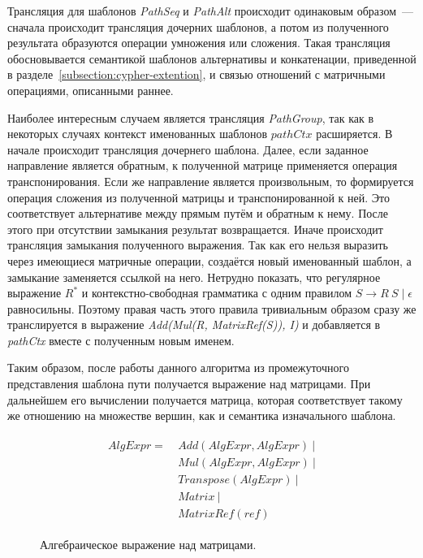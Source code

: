 Трансляция для шаблонов \textit{PathSeq} и \textit{PathAlt} происходит одинаковым образом~--- сначала происходит трансляция дочерних шаблонов, а потом из полученного результата образуются операции умножения или сложения. Такая трансляция обосновывается семантикой шаблонов альтернативы и конкатенации, приведенной в разделе~\ref{subsection:cypher-extention}, и связью отношений с матричными операциями, описанными раннее.

Наиболее интересным случаем является трансляция \textit{Path\-Group}, так как в некоторых случаях контекст именованных шаблонов $pathCtx$ расширяется. В начале происходит трансляция дочернего шаблона. Далее, если заданное направление является обратным, к полученной матрице применяется операция транспонирования. Если же направление является произвольным, то формируется операция сложения из полученной матрицы и транспонированной к ней. Это соответствует альтернативе между прямым путём и обратным к нему. После этого при отсутствии замыкания результат возвращается. Иначе происходит трансляция замыкания полученного выражения. Так как его нельзя выразить через имеющиеся матричные операции, создаётся новый именованный шаблон, а замыкание заменяется ссылкой на него. Нетрудно показать, что регулярное выражение $R^*$ и контекстно-свободная грамматика с одним правилом $S \rightarrow R~S \mid \epsilon$ равносильны. Поэтому правая часть этого правила тривиальным образом сразу же транслируется в выражение \textit{Add(Mul(R, MatrixRef(S)), I)} и добавляется в \textit{pathCtx} вместе с полученным новым именем.

Таким образом, после работы данного алгоритма из промежуточного представления шаблона пути получается выражение над матрицами. При дальнейшем его вычислении получается матрица, которая соответствует такому же отношению на множестве вершин, как и семантика изначального шаблона.



\begin{figure}[H]
\begin{align*}
\begin{split}
AlgExpr= ~ &Add(AlgExpr, AlgExpr)~|\\
           &Mul(AlgExpr, AlgExpr)~|\\
           &Transpose(AlgExpr)~|\\
           &Matrix~|\\
           &MatrixRef(ref)
\end{split}
\end{align*}
\caption{Алгебраическое выражение над матрицами.}
\label{fig:alg-expr}
\end{figure}

